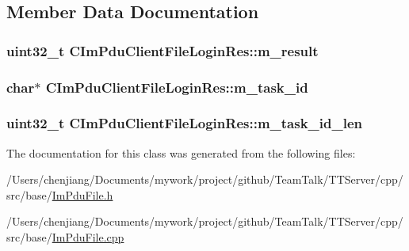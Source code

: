 \subsection{Member Data Documentation}
\hypertarget{class_c_im_pdu_client_file_login_res_ab3aea3c2ea6f7b284308319837fd38d1}{}
\subsubsection[{m\+\_\+result}]{\setlength{\rightskip}{0pt plus 5cm}uint32\+\_\+t C\+Im\+Pdu\+Client\+File\+Login\+Res\+::m\+\_\+result\hspace{0.3cm}{\ttfamily [private]}}\label{class_c_im_pdu_client_file_login_res_ab3aea3c2ea6f7b284308319837fd38d1}
\hypertarget{class_c_im_pdu_client_file_login_res_ac6215cca23e4b19cda7637782477230d}{}
\subsubsection[{m\+\_\+task\+\_\+id}]{\setlength{\rightskip}{0pt plus 5cm}char$\ast$ C\+Im\+Pdu\+Client\+File\+Login\+Res\+::m\+\_\+task\+\_\+id\hspace{0.3cm}{\ttfamily [private]}}\label{class_c_im_pdu_client_file_login_res_ac6215cca23e4b19cda7637782477230d}
\hypertarget{class_c_im_pdu_client_file_login_res_a62d36989b5eb499c9e5eb148b1471175}{}
\subsubsection[{m\+\_\+task\+\_\+id\+\_\+len}]{\setlength{\rightskip}{0pt plus 5cm}uint32\+\_\+t C\+Im\+Pdu\+Client\+File\+Login\+Res\+::m\+\_\+task\+\_\+id\+\_\+len\hspace{0.3cm}{\ttfamily [private]}}\label{class_c_im_pdu_client_file_login_res_a62d36989b5eb499c9e5eb148b1471175}


The documentation for this class was generated from the following files\+:\begin{DoxyCompactItemize}
\item 
/\+Users/chenjiang/\+Documents/mywork/project/github/\+Team\+Talk/\+T\+T\+Server/cpp/src/base/\hyperlink{_im_pdu_file_8h}{Im\+Pdu\+File.\+h}\item 
/\+Users/chenjiang/\+Documents/mywork/project/github/\+Team\+Talk/\+T\+T\+Server/cpp/src/base/\hyperlink{_im_pdu_file_8cpp}{Im\+Pdu\+File.\+cpp}\end{DoxyCompactItemize}

